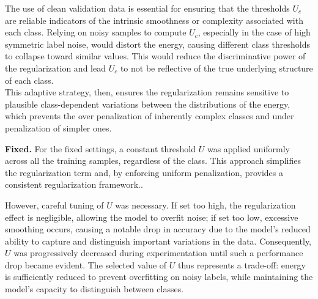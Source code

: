 {The use of clean validation data is essential for ensuring that the thresholds $U_c$ are reliable indicators of the intrinsic smoothness or complexity associated with each class. Relying on noisy samples to compute $U_c$, especially in the case of high symmetric label noise, would distort the energy, causing different class thresholds to collapse toward similar values. This would reduce the discriminative power of the regularization and lead $U_c$ to not be reflective of the true underlying structure of each class. \\
This adaptive strategy, then, ensures the regularization remains sensitive to plausible class-dependent variations between the distributions of the energy, which prevents the over penalization of inherently complex classes and under penalization of simpler ones.


\textbf{Fixed.} For the fixed settings, a constant threshold $U$ was applied uniformly across all the training samples, regardless of the class. This approach simplifies the regularization term and, by enforcing uniform penalization, provides a consistent regularization framework.. 

However, careful tuning of $U$ was necessary. If set too high, the regularization effect is negligible, allowing the model to overfit noise; if set too low, excessive smoothing occurs, causing a notable drop in accuracy due to the model’s reduced ability to capture and distinguish important variations in the data. Consequently, $U$ was progressively decreased during experimentation until such a performance drop became evident. The selected value of $U$  thus represents a trade-off: energy is sufficiently reduced to prevent overfitting on noisy labels, while maintaining the model's capacity to distinguish between classes.

}


